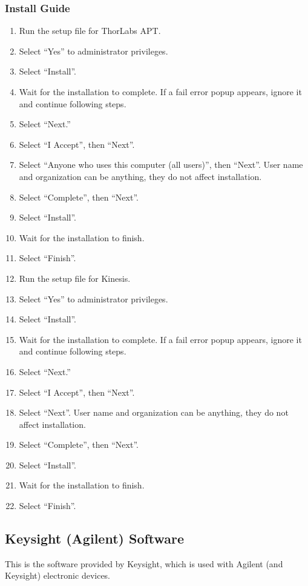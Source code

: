 \documentclass[11pt, letterpaper, titlepage]{article}
\begin{document}
\subsubsection{Install Guide} %
\begin{enumerate}
    \item Run the setup file for ThorLabs APT.
    \item Select ``Yes'' to administrator privileges.
    \item Select ``Install''.
    \item Wait for the installation to complete.
        \subitem If a fail error popup appears, ignore it and continue following steps.
    \item Select ``Next.''
    \item Select ``I Accept'', then ``Next''.
    \item Select ``Anyone who uses this computer (all users)'', then ``Next''.
        \subitem User name and organization can be anything, they do not affect installation.
    \item Select ``Complete'', then ``Next''.
    \item Select ``Install''.
    \item Wait for the installation to finish.
    \item Select ``Finish''.
    \item Run the setup file for Kinesis.
    \item Select ``Yes'' to administrator privileges.
    \item Select ``Install''.
    \item Wait for the installation to complete.
        \subitem If a fail error popup appears, ignore it and continue following steps.
    \item Select ``Next.''
    \item Select ``I Accept'', then ``Next''.
    \item Select ``Next''.
        \subitem User name and organization can be anything, they do not affect installation.
    \item Select ``Complete'', then ``Next''.
    \item Select ``Install''.
    \item Wait for the installation to finish.
    \item Select ``Finish''.
\end{enumerate}
\subsection{Keysight (Agilent) Software} \label{keysightsoftware} %
This is the software provided by Keysight, which is used with Agilent (and Keysight) electronic devices.
\end{document}
